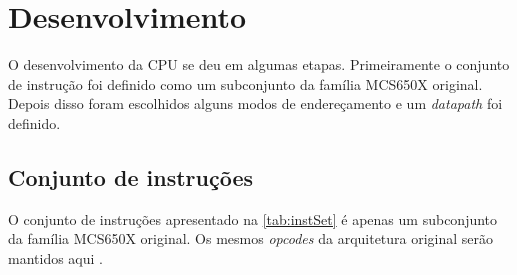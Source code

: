 \documentclass[
	12pt,				  %
	openright,		%
	a4paper,			%
	english,			%
	french,				%
	spanish,			%
	brazil,				%
]{abntex2}
\begin{document}
\chapter{Desenvolvimento}

O desenvolvimento da CPU se deu em algumas etapas. Primeiramente o conjunto de
instrução foi definido como um subconjunto da família MCS650X original. Depois
disso foram escolhidos alguns modos de endereçamento e um \emph{datapath} foi
definido.

\section{Conjunto de instruções}
O conjunto de instruções apresentado na \autoref{tab:instSet} é apenas um
subconjunto da família MCS650X original. Os mesmos \emph{opcodes} da arquitetura
original serão mantidos aqui \cite{6502isa}.
\end{document}
